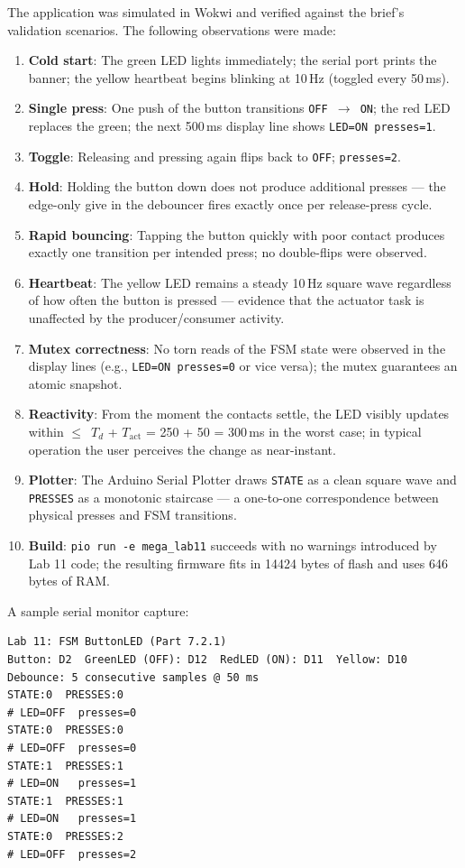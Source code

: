 \documentclass[12pt]{article}
\begin{document}
The application was simulated in Wokwi and verified against the brief's validation scenarios. The following observations were made:
\begin{enumerate}
  \item \textbf{Cold start}: The green LED lights immediately; the serial port prints the banner; the yellow heartbeat begins blinking at 10\,Hz (toggled every 50\,ms).
  \item \textbf{Single press}: One push of the button transitions \texttt{OFF $\to$ ON}; the red LED replaces the green; the next 500\,ms display line shows \texttt{LED=ON  presses=1}.
  \item \textbf{Toggle}: Releasing and pressing again flips back to \texttt{OFF}; \texttt{presses=2}.
  \item \textbf{Hold}: Holding the button down does not produce additional presses --- the edge-only give in the debouncer fires exactly once per release-press cycle.
  \item \textbf{Rapid bouncing}: Tapping the button quickly with poor contact produces exactly one transition per intended press; no double-flips were observed.
  \item \textbf{Heartbeat}: The yellow LED remains a steady 10\,Hz square wave regardless of how often the button is pressed --- evidence that the actuator task is unaffected by the producer/consumer activity.
  \item \textbf{Mutex correctness}: No torn reads of the FSM state were observed in the display lines (e.g., \texttt{LED=ON  presses=0} or vice versa); the mutex guarantees an atomic snapshot.
  \item \textbf{Reactivity}: From the moment the contacts settle, the LED visibly updates within $\le$~$T_d$ + $T_{\text{act}}$ = 250 + 50 = 300\,ms in the worst case; in typical operation the user perceives the change as near-instant.
  \item \textbf{Plotter}: The Arduino Serial Plotter draws \texttt{STATE} as a clean square wave and \texttt{PRESSES} as a monotonic staircase --- a one-to-one correspondence between physical presses and FSM transitions.
  \item \textbf{Build}: \texttt{pio run -e mega\_lab11} succeeds with no warnings introduced by Lab 11 code; the resulting firmware fits in 14424 bytes of flash and uses 646 bytes of RAM.
\end{enumerate}

A sample serial monitor capture:

\begin{lstlisting}
Lab 11: FSM ButtonLED (Part 7.2.1)
Button: D2  GreenLED (OFF): D12  RedLED (ON): D11  Yellow: D10
Debounce: 5 consecutive samples @ 50 ms
STATE:0  PRESSES:0
# LED=OFF  presses=0
STATE:0  PRESSES:0
# LED=OFF  presses=0
STATE:1  PRESSES:1
# LED=ON   presses=1
STATE:1  PRESSES:1
# LED=ON   presses=1
STATE:0  PRESSES:2
# LED=OFF  presses=2
\end{lstlisting}
\end{document}
